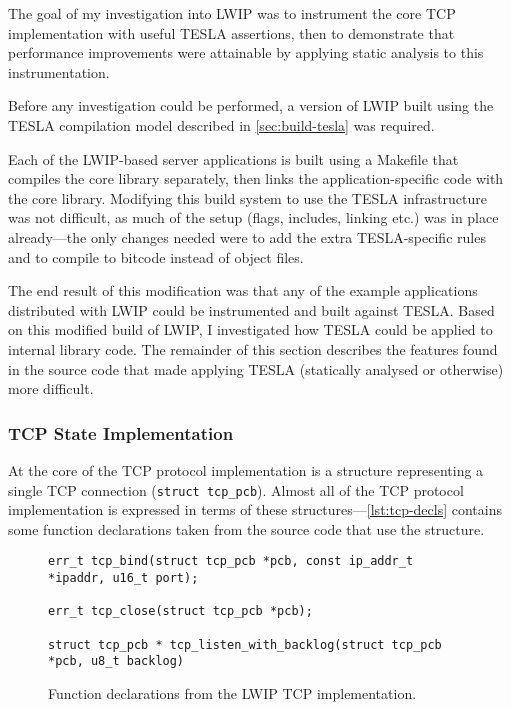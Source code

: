 The goal of my investigation into LWIP was to instrument the core TCP
implementation with useful TESLA assertions, then to demonstrate that
performance improvements were attainable by applying static analysis to
this instrumentation.

Before any investigation could be performed, a version of LWIP built
using the TESLA compilation model described in \autoref{sec:build-tesla}
was required.

Each of the LWIP-based server applications is built using a Makefile
that compiles the core library separately, then links the
application-specific code with the core library. Modifying this build
system to use the TESLA infrastructure was not difficult, as much of the
setup (flags, includes, linking etc.) was in place already---the only
changes needed were to add the extra TESLA-specific rules and to compile
to bitcode instead of object files.

The end result of this modification was that any of the example applications
distributed with LWIP could be instrumented and built against TESLA. Based on
this modified build of LWIP, I investigated how TESLA could be applied to
internal library code. The remainder of this section describes the features
found in the source code that made applying TESLA (statically analysed or
otherwise) more difficult.

\subsubsection{TCP State Implementation}

At the core of the TCP protocol implementation is a structure
representing a single TCP connection (\texttt{struct tcp_pcb}).
Almost all of the TCP protocol implementation is expressed in terms of
these structures---\autoref{lst:tcp-decls} contains some function
declarations taken from the source code that use the structure.

\begin{figure}
  \begin{verbatim}
err_t tcp_bind(struct tcp_pcb *pcb, const ip_addr_t *ipaddr, u16_t port);

err_t tcp_close(struct tcp_pcb *pcb);

struct tcp_pcb * tcp_listen_with_backlog(struct tcp_pcb *pcb, u8_t backlog)
  \end{verbatim}
  \caption{Function declarations from the LWIP TCP implementation.}
  \label{lst:tcp-decls}
\end{figure}

